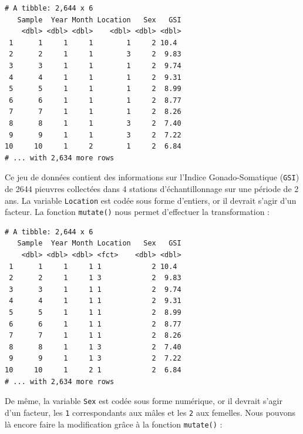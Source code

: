 \documentclass[a4paperpaper,]{article}
\newenvironment{Shaded}{\begin{snugshade}}{\end{snugshade}}
\newcommand{\DataTypeTok}[1]{\textcolor[rgb]{0.00,0.34,0.68}{#1}}
\newcommand{\DecValTok}[1]{\textcolor[rgb]{0.69,0.50,0.00}{#1}}
\newcommand{\KeywordTok}[1]{\textcolor[rgb]{0.12,0.11,0.11}{\textbf{#1}}}
\newcommand{\NormalTok}[1]{\textcolor[rgb]{0.12,0.11,0.11}{#1}}
\newcommand{\OperatorTok}[1]{\textcolor[rgb]{0.12,0.11,0.11}{#1}}
\newcommand{\StringTok}[1]{\textcolor[rgb]{0.75,0.01,0.01}{#1}}
\theoremstyle{definition}
\theoremstyle{definition}
\theoremstyle{definition}
\theoremstyle{remark}
\begin{document}
\begin{verbatim}
# A tibble: 2,644 x 6
   Sample  Year Month Location   Sex   GSI
    <dbl> <dbl> <dbl>    <dbl> <dbl> <dbl>
 1      1     1     1        1     2 10.4 
 2      2     1     1        3     2  9.83
 3      3     1     1        1     2  9.74
 4      4     1     1        1     2  9.31
 5      5     1     1        1     2  8.99
 6      6     1     1        1     2  8.77
 7      7     1     1        1     2  8.26
 8      8     1     1        3     2  7.40
 9      9     1     1        3     2  7.22
10     10     1     2        1     2  6.84
# ... with 2,634 more rows
\end{verbatim}

Ce jeu de données contient des informations sur l'Indice
Gonado-Somatique (\texttt{GSI}) de 2644 pieuvres collectées dans 4
stations d'échantillonnage sur une période de 2 ans. La variable
\texttt{Location} est codée sous forme d'entiers, or il devrait s'agir
d'un facteur. La fonction \texttt{mutate()} nous permet d'effectuer la
transformation :

\begin{Shaded}
\end{Shaded}

\begin{verbatim}
# A tibble: 2,644 x 6
   Sample  Year Month Location   Sex   GSI
    <dbl> <dbl> <dbl> <fct>    <dbl> <dbl>
 1      1     1     1 1            2 10.4 
 2      2     1     1 3            2  9.83
 3      3     1     1 1            2  9.74
 4      4     1     1 1            2  9.31
 5      5     1     1 1            2  8.99
 6      6     1     1 1            2  8.77
 7      7     1     1 1            2  8.26
 8      8     1     1 3            2  7.40
 9      9     1     1 3            2  7.22
10     10     1     2 1            2  6.84
# ... with 2,634 more rows
\end{verbatim}

De même, la variable \texttt{Sex} est codée sous forme numérique, or il
devrait s'agir d'un facteur, les \texttt{1} correspondants aux mâles et
les \texttt{2} aux femelles. Nous pouvons là encore faire la
modification grâce à la fonction \texttt{mutate()} :

\begin{Shaded}
\end{Shaded}
\end{document}
